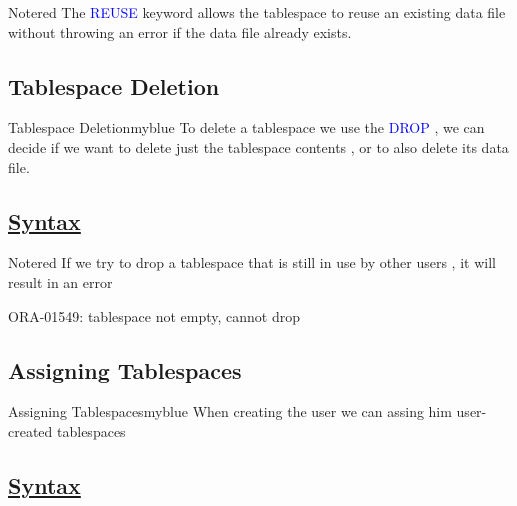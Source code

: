 \vspace{0.25cm}

\begin{prettyBox}{Note}{red}
The \textcolor{blue}{REUSE} keyword allows the tablespace to reuse an existing 
data file without throwing an error if the data file already exists.
\end{prettyBox}

\vspace{0.25cm}
\subsection{Tablespace Deletion}
\begin{prettyBox}{Tablespace Deletion}{myblue}
To delete a tablespace we use the \textcolor{blue}{DROP} , we can decide
if we want to delete just the tablespace contents , or to also delete its data file.
\end{prettyBox}

\vspace{0.15cm}
\subsection*{\underline{Syntax}}


\vspace{0.15cm}
\begin{prettyBox}{Note}{red}
If we try to drop a tablespace that is still in use by other users , it will result in an error
\begin{center}
ORA-01549: tablespace not empty, cannot drop
\end{center}
\end{prettyBox}


\subsection{Assigning Tablespaces}
\begin{prettyBox}{Assigning Tablespaces}{myblue}
When creating the user we can assing him user-created tablespaces
\end{prettyBox}

\vspace{0.15cm}
\subsection*{\underline{Syntax}}



\vspace{0.25cm}

